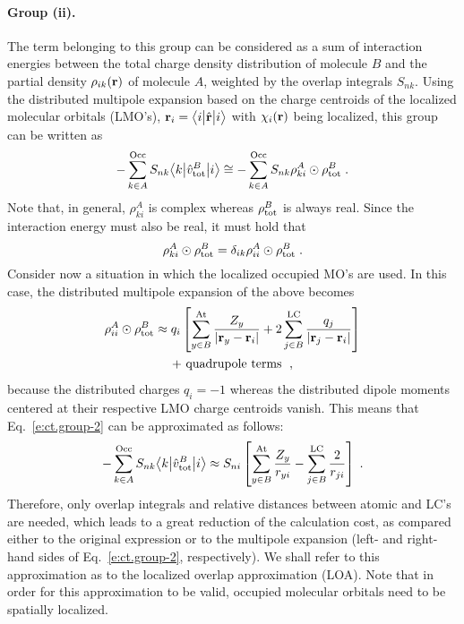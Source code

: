 \paragraph{Group (ii).}
The term belonging to this group can be considered as a sum of interaction
energies between the total charge density distribution of molecule $B$
and the partial density $\rho_{ik}({\bf r})$ of molecule $A$,
weighted by the overlap integrals $S_{nk}$. Using the distributed multipole 
expansion based on the charge centroids of the localized molecular orbitals (LMO's),
${\bf r}_i = \bigl\langle {i} \bigl\lvert {\hat{\bf r}} \bigl\lvert {i} \bigr\rangle$ with $\chi_i({\bf r})$ being localized,
this group can be written as
%
\begin{equation} \label{e:ct.group-2}
      - \sum_{k\in A}^{\rm Occ} S_{nk}  \bigl\langle {k} \bigl\lvert {\hat{v}^B_{\rm tot} } \bigl\lvert {i} \bigr\rangle 
 \cong - \sum_{k\in A}^{\rm Occ} S_{nk} \rho_{ki}^A \odot \rho^B_{\rm tot} \;.
\end{equation}
%
Note that, in general, $\rho_{ki}^A$ is complex whereas $\rho^B_{\rm tot}$ is always real.
Since the interaction energy must also be real, it must hold that
%
\begin{equation} \label{e:ct.group-2-d}
 \rho_{ki}^A \odot \rho^B_{\rm tot} = \delta_{ik} \rho_{ii}^A \odot \rho^B_{\rm tot} \;.
\end{equation}
%
Consider now a situation in which the localized occupied MO's are used.
In this case, the distributed multipole expansion
of the above becomes
%
\begin{multline}
 \rho_{ii}^A \odot \rho^B_{\rm tot} 
 \approx 
 q_{i} 
 \left[
 \sum_{y\in B}^{\rm At}
  \frac{Z_y}{\vert {\bf r}_y - {\bf r}_i \vert } 
 +
 2\sum_{j\in B}^{\rm LC}
  \frac{q_j}{\vert {\bf r}_j - {\bf r}_i \vert } 
 \right] \\
 + \text{ quadrupole terms } \;,
\end{multline}
%
because the distributed charges
$q_i = -1$ whereas the distributed dipole moments %
centered at their
respective LMO charge centroids vanish.\cite{Etchebest.Lavery.Pullman.TheorChimActa.1982}
This means that Eq.~\eqref{e:ct.group-2} can be approximated as follows:
%
\begin{equation} \label{e:ct.group-ii.final}
      - \sum_{k\in A}^{\rm Occ} S_{nk} \bigl\langle {k} \bigl\lvert {\hat{v}^B_{\rm tot} } \bigl\lvert {i} \bigr\rangle 
 \approx S_{ni}  \left[
 \sum_{y\in B}^{\rm At}
  \frac{Z_y}{ r_{yi} } 
 -
 \sum_{j\in B}^{\rm LC}
  \frac{2}{r_{ji}} 
 \right] \;.
\end{equation}
%
Therefore, only overlap integrals and relative distances between
atomic and LC's are needed, which leads to a great reduction of the
calculation cost,
as compared either to the original expression or to the multipole expansion (left\hyp{} and right\hyp{}hand sides
of Eq.~\eqref{e:ct.group-2}, respectively).
We shall refer to this approximation as to
the localized overlap approximation (LOA). Note that in order for this approximation to be valid,
occupied molecular orbitals need to be spatially localized.

